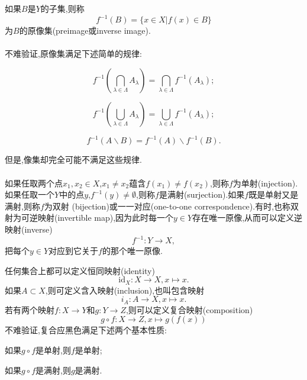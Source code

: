 如果$B$是$Y$的子集,则称\begin{equation}
f^{-1}(B) = \{x\in X|f(x)\in B\}
\end{equation}
为$B$的原像集(preimage或inverse image).
\\ \hspace*{\fill} \\%
不难验证,原像集满足下述简单的规律:
\begin{blist}
	\item \begin{equation}
	f^{-1}\left(\bigcap_{\lambda\in\Lambda}A_{\lambda} \right) = \bigcap_{\lambda\in\Lambda}f^{-1}\left(A_{\lambda}\right);
	\end{equation}
	\item \begin{equation}
	f^{-1}\left(\bigcup_{\lambda\in\Lambda}A_{\lambda} \right) = \bigcup_{\lambda\in\Lambda}f^{-1}\left(A_{\lambda}\right);
	\end{equation}
	\item \begin{equation}
	f^{-1}(A\backslash B) = f^{-1}(A) \backslash f^{-1}(B).
	\end{equation}
\end{blist}



但是,像集却完全可能不满足这些规律.
\\ \hspace*{\fill} \\%
如果任取两个点$x_1,x_2\in X$,$x_1\neq x_2$蕴含$f(x_1)\neq f(x_2)$,则称$f$为单射(injection).如果任取一个$Y$中的点$y$,$f^{-1}(y)\neq\emptyset$,则称$f$是满射(surjection).如果$f$既是单射又是满射,则称$f$为双射 (bijection)或一一对应(one-to-one correspondence).有时,也称双射为可逆映射(invertible map),因为此时每一个$y\in Y$存在唯一原像,从而可以定义逆映射(inverse)
\begin{equation}
f^{-1}:Y\to X,
\end{equation}
把每个$y\in Y$对应到它关于$f$的那个唯一原像.



任何集合上都可以定义恒同映射(identity)\begin{equation}
\mathrm{id}_X:X\to X,x\mapsto x.
\end{equation}
如果$A\subset X$,则可定义含入映射(inclusion),也叫包含映射\begin{equation}
i_A:A\to X,x\mapsto x.
\end{equation}
若有两个映射$f:X\to Y$和$g:Y\to Z$,则可以定义复合映射(composition)\begin{equation}
g\circ f:X\to Z,x\mapsto g(f(x))
\end{equation}
不难验证,复合应黑色满足下述两个基本性质:
\begin{blist}
	\item 如果$g\circ f$是单射,则$f$是单射;
	\item 如果$g\circ f$是满射,则$g$是满射.
\end{blist}



